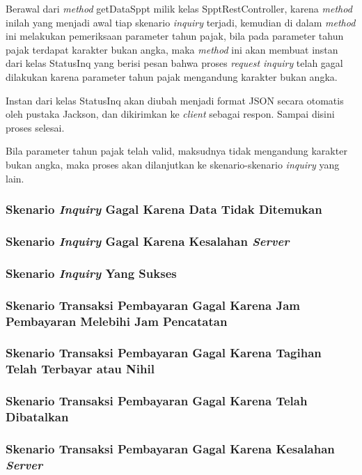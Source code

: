 \documentclass[pdftex,12pt, oneside]{article}
\begin{document}
Berawal dari \textit{method} getDataSppt milik kelas SpptRestController, karena \textit{method} inilah yang menjadi awal tiap skenario \textit{inquiry} terjadi, kemudian di dalam \textit{method} ini melakukan pemeriksaan parameter tahun pajak, bila pada parameter tahun pajak terdapat karakter bukan angka, maka \textit{method} ini akan membuat instan dari kelas StatusInq yang berisi pesan bahwa proses \textit{request inquiry} telah gagal dilakukan karena parameter tahun pajak mengandung karakter bukan angka. 

Instan dari kelas StatusInq akan diubah menjadi format JSON secara otomatis oleh pustaka Jackson, dan dikirimkan ke \textit{client} sebagai respon. Sampai disini proses selesai.

Bila parameter tahun pajak telah valid, maksudnya tidak mengandung karakter bukan angka, maka proses akan dilanjutkan ke skenario-skenario \textit{inquiry} yang lain.

\subsubsection{Skenario \textit{Inquiry} Gagal Karena Data Tidak Ditemukan}
\subsubsection{Skenario \textit{Inquiry} Gagal Karena Kesalahan \textit{Server}}
\subsubsection{Skenario \textit{Inquiry} Yang Sukses}
\subsubsection{Skenario Transaksi Pembayaran Gagal Karena Jam Pembayaran Melebihi Jam Pencatatan}
\subsubsection{Skenario Transaksi Pembayaran Gagal Karena Tagihan Telah Terbayar atau Nihil}
\subsubsection{Skenario Transaksi Pembayaran Gagal Karena Telah Dibatalkan}
\subsubsection{Skenario Transaksi Pembayaran Gagal Karena Kesalahan \textit{Server}}
\end{document}
